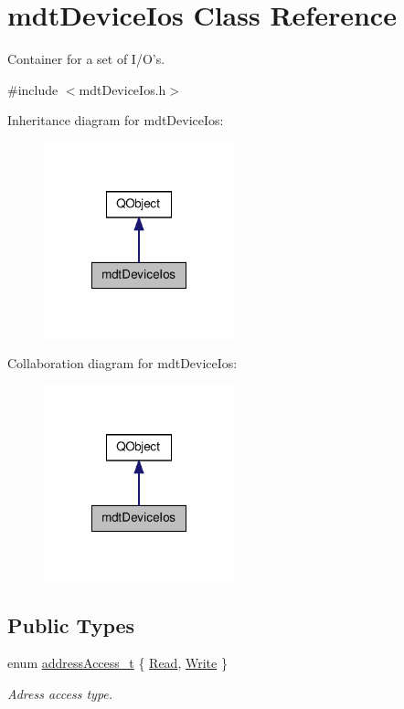 \hypertarget{classmdt_device_ios}{\section{mdt\-Device\-Ios Class Reference}
\label{classmdt_device_ios}
}


Container for a set of I/\-O's.  




{\ttfamily \#include $<$mdt\-Device\-Ios.\-h$>$}



Inheritance diagram for mdt\-Device\-Ios\-:\nopagebreak
\begin{figure}[H]
\begin{center}
\leavevmode
\includegraphics[width=156pt]{classmdt_device_ios__inherit__graph}
\end{center}
\end{figure}


Collaboration diagram for mdt\-Device\-Ios\-:\nopagebreak
\begin{figure}[H]
\begin{center}
\leavevmode
\includegraphics[width=156pt]{classmdt_device_ios__coll__graph}
\end{center}
\end{figure}
\subsection*{Public Types}
\begin{DoxyCompactItemize}
\item 
enum \hyperlink{classmdt_device_ios_a72fc3fdcd905d669b1e90496e808d6dd}{address\-Access\-\_\-t} \{ \hyperlink{classmdt_device_ios_a72fc3fdcd905d669b1e90496e808d6dda69811abe027fb5c9c22cf99034ef626b}{Read}, 
\hyperlink{classmdt_device_ios_a72fc3fdcd905d669b1e90496e808d6dda29a5b11f060f7fce671b9ced4bb4ef7a}{Write}
 \}
\begin{DoxyCompactList}\small\item\em Adress access type. \end{DoxyCompactList}\end{DoxyCompactItemize}
